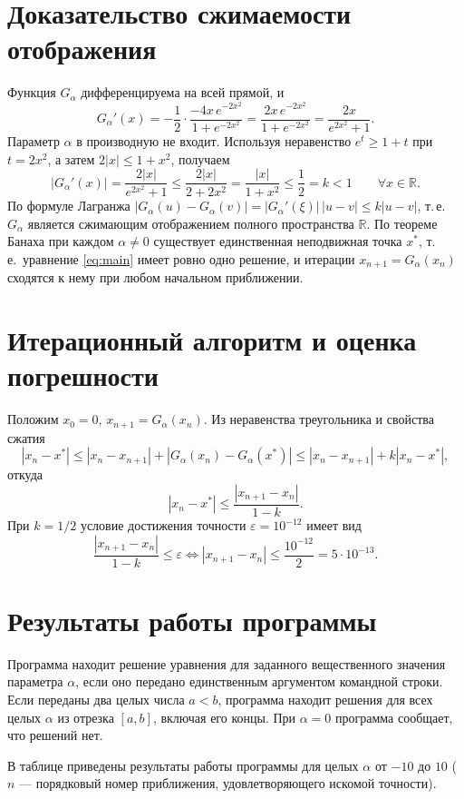 \documentclass[12pt,a4paper]{article}
\begin{document}
\section{Доказательство сжимаемости отображения}
Функция $G_\alpha$ дифференцируема на всей прямой, и
\[
G_\alpha'(x)=-\frac12\cdot\frac{-4x\,e^{-2x^2}}{1+e^{-2x^2}}=\frac{2x\,e^{-2x^2}}{1+e^{-2x^2}}=\frac{2x}{e^{2x^2}+1}.
\]
Параметр $\alpha$ в производную не входит. Используя неравенство $e^{t}\ge1+t$ при $t=2x^2$, а затем $2|x|\le1+x^2$, получаем
\begin{equation}\label{eq:k}
|G_\alpha'(x)|=\frac{2|x|}{e^{2x^2}+1}\le\frac{2|x|}{2+2x^2}=\frac{|x|}{1+x^2}\le\frac12=k<1
\qquad\forall x\in\mathbb R.
\end{equation}
По формуле Лагранжа $|G_\alpha(u)-G_\alpha(v)|=|G_\alpha'(\xi)|\,|u-v|\le k|u-v|$, т.\,е.\
$G_\alpha$ является сжимающим отображением полного пространства $\mathbb R$. По теореме Банаха
при каждом $\alpha\ne0$ существует единственная неподвижная точка $x^*$, т.\,е.\ уравнение
\eqref{eq:main} имеет ровно одно решение, и итерации $x_{n+1}=G_\alpha(x_n)$ сходятся к нему
при любом начальном приближении.

\section{Итерационный алгоритм и оценка погрешности}
Положим $x_0=0$, $x_{n+1}=G_\alpha(x_n)$. Из неравенства треугольника и свойства сжатия
\[
|x_n-x^*|\le|x_n-x_{n+1}|+|G_\alpha(x_n)-G_\alpha(x^*)|\le|x_n-x_{n+1}|+k|x_n-x^*|,
\]
откуда
\[
|x_n-x^*|\le\frac{|x_{n+1}-x_n|}{1-k}.
\]
При $k=1/2$ условие достижения точности $\varepsilon=10^{-12}$ имеет вид
\begin{equation}\label{eq:stop}
\frac{|x_{n+1}-x_n|}{1-k}\le\varepsilon\iff|x_{n+1}-x_n|\le\frac{10^{-12}}{2}=5\cdot10^{-13}.
\end{equation}

\section{Результаты работы программы}
Программа находит решение уравнения для заданного вещественного значения параметра $\alpha$,
если оно передано единственным аргументом командной строки. Если переданы два целых числа
$a<b$, программа находит решения для всех целых $\alpha$ из отрезка $[a,b]$, включая его концы.
При $\alpha=0$ программа сообщает, что решений нет.

В таблице приведены результаты работы программы для целых $\alpha$ от $-10$ до $10$
($n$ — порядковый номер приближения, удовлетворяющего искомой точности).
\end{document}
